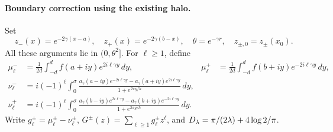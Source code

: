 \paragraph{Boundary correction using the existing halo.}
Set
\begin{equation}
 z_-(x)=e^{-2\gamma(x-a)},\quad z_+(x)=e^{-2\gamma(b-x)},
 \quad\theta=e^{-\gamma r},\quad z_{\pm,0}=z_\pm(x_0).
 \label{eq:zpm}
\end{equation}
All these arguments lie in $(0,\theta^2]$. For $\ell\ge1$, define
\begin{align}
 \mu_\ell^-&=\frac1{2d}\int_{-d}^d f(a+iy)e^{2i\ell\gamma y}\,dy,
 &\mu_\ell^+&=\frac1{2d}\int_{-d}^d f(b+iy)e^{-2i\ell\gamma y}\,dy,
 \label{eq:mu}\\
 \nu_\ell^-&=i(-1)^\ell\int_0^\sigma
 \frac{a_\gamma(a-iy)e^{-2i\ell\gamma y}-a_\gamma(a+iy)e^{2i\ell\gamma y}}
 {1+e^{2\pi y/h}}\,dy, \label{eq:numinus}\\
 \nu_\ell^+&=i(-1)^\ell\int_0^\sigma
 \frac{a_\gamma(b-iy)e^{2i\ell\gamma y}-a_\gamma(b+iy)e^{-2i\ell\gamma y}}
 {1+e^{2\pi y/h}}\,dy. \label{eq:nuplus}
\end{align}
Write $g_\ell^\pm=\mu_\ell^\pm-\nu_\ell^\pm$,
$G^\pm(z)=\sum_{\ell\ge1}g_\ell^\pm z^\ell$, and
$D_\lambda=\pi/(2\lambda)+4\log2/\pi$.


